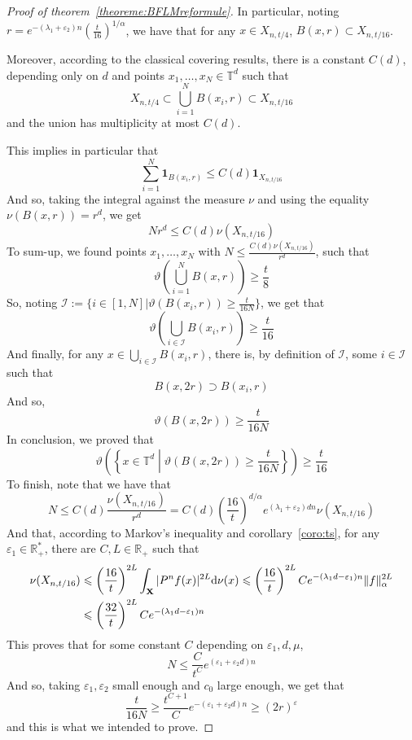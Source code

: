 \documentclass[11pt]{amsart}
\theoremstyle{definition}
\theoremstyle{remark}
\numberwithin{equation}{section}
\begin{document}
\begin{proof}[Proof of theorem~\ref{theoreme:BFLMreformule}]
In particular, noting $r= e^{-(\lambda_1 + \varepsilon_2 )n}\left(\frac t{16} \right)^{1/\alpha}$, we have that for any $x\in X_{n,t/4}$, $B(x, r)\subset X_{n,t/16}$.

Moreover, according to the classical covering results, there is a constant $C(d)$, depending only on $d$ and points $x_1, \dots, x_N \in {\mathbb T}^d$ such that
\[
X_{n,t/4} \subset \bigcup_{i=1}^N B(x_i,r) \subset X_{n,t/16}
\]
and the union has multiplicity at most $C(d)$. 

This implies in particular that
\[
\sum_{i=1}^N {\mathbf{1}}_{B(x_i,r)} \leqslant C(d) {\mathbf{1}}_{X_{n,t/16}}
\]
And so, taking the integral against the measure $\nu$ and using the equality $\nu(B(x,r)) = r^d$, we get
\[
Nr^d \leqslant C(d) \nu(X_{n,t/16})
\]
To sum-up, we found points $x_1,\dots, x_N$ with $ N\leqslant\frac{C(d) \nu(X_{n,t/16})}{r^d}$, such that
\[
\vartheta\left(\bigcup_{i=1}^N B(x,r)\right) \geqslant \frac t 8
\]
So, noting $\mathcal{I}:=\{i\in [1,N] | \vartheta(B(x_i,r)) \geqslant \frac t{16N} \}$, we get that
\[
\vartheta\left(\bigcup_{i\in \mathcal{I}} B(x_i,r)\right) \geqslant \frac t {16}
\]
And finally, for any $x\in \bigcup_{i\in \mathcal{I}} B(x_i,r)$, there is, by definition of $\mathcal{I}$, some $i \in \mathcal{I}$ such that
\[
B(x,2r) \supset B(x_i, r)
\]
And so,
\[
\vartheta(B(x,2r)) \geqslant \frac t{16N}
\]
In conclusion, we proved that
\[
\vartheta\left(\left\{x\in {\mathbb T}^d \middle| \vartheta(B(x,2r)) \geqslant \frac t{16 N} \right\}\right) \geqslant \frac t {16}
\]
To finish, note that we have that
\[
N \leqslant C(d) \frac{\nu(X_{n,t/16})}{r^d} = C(d) \left(\frac{16} t\right)^{d/\alpha} e^{(\lambda_1 + \varepsilon_2)dn} \nu(X_{n,t/16})
\]
And that, according to Markov's inequality and corollary~\ref{coro:ts}, for any $\varepsilon_1 \in {\mathbb R}_+^\ast$, there are $C,L\in {\mathbb R}_+$ such that
\begin{align*}
\nu(X_{n,t/16}) &\leqslant \left(\frac {16} t\right)^{2L} \int_{\mathbf X} |P^n f(x)|^{2L} {{\rm d}}\nu(x)\leqslant \left(\frac {16} t\right)^{2L} Ce^{-(\lambda_1d-\varepsilon_1)n} \|f\|_\alpha^{2L} \\& \leqslant\left(\frac {32} t\right)^{2L} Ce^{-(\lambda_1d-\varepsilon_1)n} 
\end{align*}
This proves that for some constant $C$ depending on $\varepsilon_1,d,\mu$,
\[
N \leqslant \frac{ C}{t^C} e^{(\varepsilon_1 + \varepsilon_2 d ) n}
\]
And so, taking $\varepsilon_1,\varepsilon_2$ small enough and $c_0$ large enough, we get that
\[
\frac{t}{16 N} \geqslant \frac{ t^{C+1}}C e^{-(\varepsilon_1+ \varepsilon_2 d) n} \geqslant (2r)^\varepsilon
\]
and this is what we intended to prove.
\end{proof}
\end{document}
